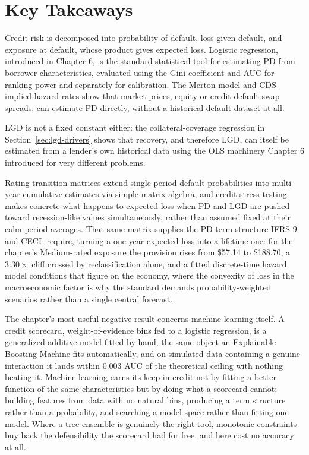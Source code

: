 \documentclass[../ai_in_finance]{subfiles}
\begin{document}
\section{Key Takeaways}

Credit risk is decomposed into probability of default, loss given default, and exposure at default, whose product gives expected loss. Logistic regression, introduced in Chapter 6, is the standard statistical tool for estimating PD from borrower characteristics, evaluated using the Gini coefficient and AUC for ranking power and separately for calibration. The Merton model and CDS-implied hazard rates show that market prices, equity or credit-default-swap spreads, can estimate PD directly, without a historical default dataset at all.

LGD is not a fixed constant either: the collateral-coverage regression in Section~\ref{sec:lgd-drivers} shows that recovery, and therefore LGD, can itself be estimated from a lender's own historical data using the OLS machinery Chapter 6 introduced for very different problems.

Rating transition matrices extend single-period default probabilities into multi-year cumulative estimates via simple matrix algebra, and credit stress testing makes concrete what happens to expected loss when PD and LGD are pushed toward recession-like values simultaneously, rather than assumed fixed at their calm-period averages. That same matrix supplies the PD term structure IFRS 9 and CECL require, turning a one-year expected loss into a lifetime one: for the chapter's Medium-rated exposure the provision rises from \$57.14 to \$188.70, a $3.30\times$ cliff crossed by reclassification alone, and a fitted discrete-time hazard model conditions that figure on the economy, where the convexity of loss in the macroeconomic factor is why the standard demands probability-weighted scenarios rather than a single central forecast.

The chapter's most useful negative result concerns machine learning itself. A credit scorecard, weight-of-evidence bins fed to a logistic regression, is a generalized additive model fitted by hand, the same object an Explainable Boosting Machine fits automatically, and on simulated data containing a genuine interaction it lands within $0.003$ AUC of the theoretical ceiling with nothing beating it. Machine learning earns its keep in credit not by fitting a better function of the same characteristics but by doing what a scorecard cannot: building features from data with no natural bins, producing a term structure rather than a probability, and searching a model space rather than fitting one model. Where a tree ensemble is genuinely the right tool, monotonic constraints buy back the defensibility the scorecard had for free, and here cost no accuracy at all.
\end{document}
